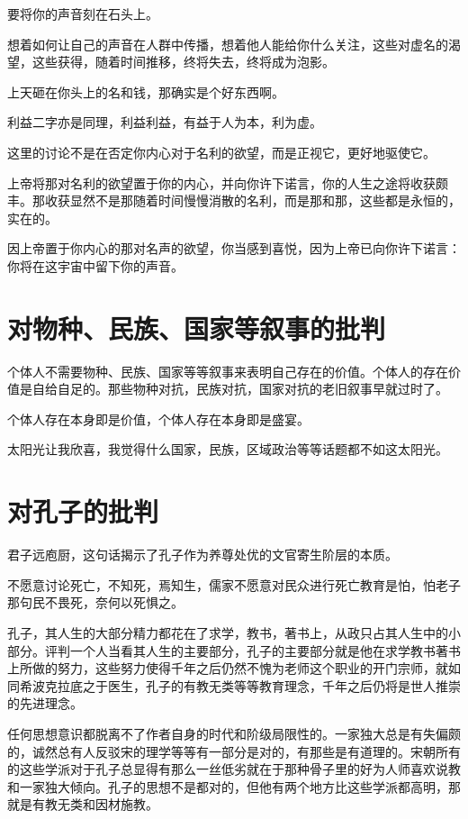 \documentclass[12pt,oneside]{book}
\begin{document}
要将你的声音刻在石头上。


想着如何让自己的声音在人群中传播，想着他人能给你什么关注，这些对虚名的渴望，这些获得，随着时间推移，终将失去，终将成为泡影。

上天砸在你头上的名和钱，那确实是个好东西啊。

利益二字亦是同理，利益利益，有益于人为本，利为虚。

这里的讨论不是在否定你内心对于名利的欲望，而是正视它，更好地驱使它。

上帝将那对名利的欲望置于你的内心，并向你许下诺言，你的人生之途将收获颇丰。那收获显然不是那随着时间慢慢消散的名利，而是那和那，这些都是永恒的，实在的。

因上帝置于你内心的那对名声的欲望，你当感到喜悦，因为上帝已向你许下诺言：你将在这宇宙中留下你的声音。

\chapter{对物种、民族、国家等叙事的批判}
个体人不需要物种、民族、国家等等叙事来表明自己存在的价值。个体人的存在价值是自给自足的。那些物种对抗，民族对抗，国家对抗的老旧叙事早就过时了。

个体人存在本身即是价值，个体人存在本身即是盛宴。

太阳光让我欣喜，我觉得什么国家，民族，区域政治等等话题都不如这太阳光。

\chapter{对孔子的批判}
君子远庖厨，这句话揭示了孔子作为养尊处优的文官寄生阶层的本质。

不愿意讨论死亡，不知死，焉知生，儒家不愿意对民众进行死亡教育是怕，怕老子那句民不畏死，奈何以死惧之。

孔子，其人生的大部分精力都花在了求学，教书，著书上，从政只占其人生中的小部分。评判一个人当看其人生的主要部分，孔子的主要部分就是他在求学教书著书上所做的努力，这些努力使得千年之后仍然不愧为老师这个职业的开门宗师，就如同希波克拉底之于医生，孔子的有教无类等等教育理念，千年之后仍将是世人推崇的先进理念。

任何思想意识都脱离不了作者自身的时代和阶级局限性的。一家独大总是有失偏颇的，诚然总有人反驳宋的理学等等有一部分是对的，有那些是有道理的。宋朝所有的这些学派对于孔子总显得有那么一丝低劣就在于那种骨子里的好为人师喜欢说教和一家独大倾向。孔子的思想不是都对的，但他有两个地方比这些学派都高明，那就是有教无类和因材施教。​
\end{document}
